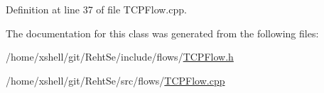 Definition at line 37 of file T\+C\+P\+Flow.\+cpp.



The documentation for this class was generated from the following files\+:\begin{DoxyCompactItemize}
\item 
/home/xshell/git/\+Reht\+Se/include/flows/\hyperlink{_t_c_p_flow_8h}{T\+C\+P\+Flow.\+h}\item 
/home/xshell/git/\+Reht\+Se/src/flows/\hyperlink{_t_c_p_flow_8cpp}{T\+C\+P\+Flow.\+cpp}\end{DoxyCompactItemize}
